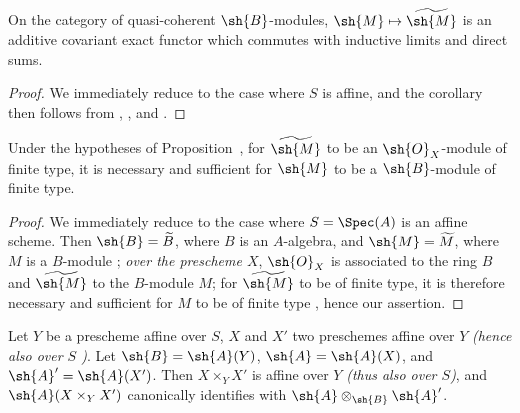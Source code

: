 \begin{corollary}[1.4.4]
\label{II.1.4.4}
On the category of quasi-coherent $\sh{B}$-modules, $\sh{M}\mapsto\widetilde{\sh{M}}$ is an additive covariant exact functor which commutes with inductive limits and direct sums.
\end{corollary}

\begin{proof}
We immediately reduce to the case where $S$ is affine, and the corollary then follows from , , and .
\end{proof}

\begin{corollary}[1.4.5]
\label{II.1.4.5}
Under the hypotheses of Proposition~, for $\widetilde{\sh{M}}$ to be an $\sh{O}_X$-module of finite type, it is necessary and sufficient for $\sh{M}$ to be a $\sh{B}$-module of finite type.
\end{corollary}

\begin{proof}
We immediately reduce to the case where $S=\Spec(A)$ is an affine scheme.
Then $\sh{B}=\widetilde{B}$, where $B$ is an $A$-algebra, and $\sh{M}=\widetilde{M}$, where $M$ is a $B$-module ; \emph{over the prescheme $X$}, $\sh{O}_X$ is associated to the ring $B$ and $\widetilde{\sh{M}}$ to the $B$-module $M$; for $\widetilde{\sh{M}}$ to be of finite type, it is therefore necessary and sufficient for $M$ to be of finite type , hence our assertion.
\end{proof}

\begin{proposition}[1.4.6]
\label{II.1.4.6}
Let $Y$ be a prescheme affine over $S$, $X$ and $X'$ two preschemes affine over $Y$ \emph{(hence also over $S$ )}.
Let $\sh{B}=\sh{A}(Y)$, $\sh{A}=\sh{A}(X)$, and $\sh{A}'=\sh{A}(X')$.
Then $X\times_Y X'$ is affine over $Y$ \emph{(thus also over $S$)}, and $\sh{A}(X\times_Y X')$ canonically identifies with $\sh{A}\otimes_\sh{B}\sh{A}'$.
\end{proposition}

